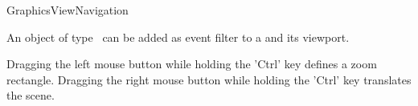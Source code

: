 
\begin{ccRefClass}{GraphicsViewNavigation}

\ccDefinition
An object of type \ccRefName\ can be added as event filter to a  and its viewport.

Dragging the left mouse button while holding the 'Ctrl' key defines a zoom rectangle.
Dragging the right mouse button while holding the 'Ctrl' key translates the scene.




\ccOperations



\end{ccRefClass}








